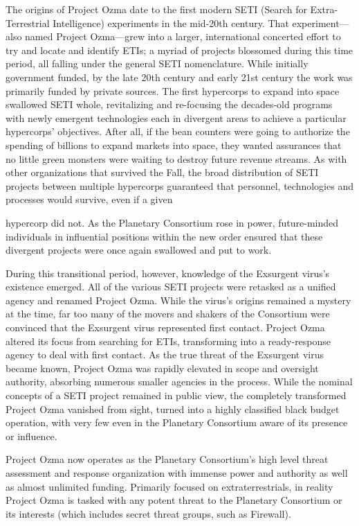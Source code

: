 The origins of Project Ozma date to the first modern SETI (Search for Extra-Terrestrial Intelligence) experiments in the mid-20th century. That experiment—also named Project Ozma—grew into a larger, international concerted effort to try and locate and identify ETIs; a myriad of projects blossomed during this time period, all falling under the general SETI nomenclature. While initially government funded, by the late 20th century and early 21st century the work was primarily funded by private sources. The first hypercorps to expand into space swallowed SETI whole, revitalizing and re-focusing the decades-old programs with newly emergent technologies each in divergent areas to achieve a particular hypercorps' objectives. After all, if the bean counters were going to authorize the spending of billions to expand markets into space, they wanted assurances that no little green monsters were waiting to destroy future revenue streams. As with other organizations that survived the Fall, the broad distribution of SETI projects between multiple hypercorps guaranteed that personnel, technologies and processes would survive, even if a given 

hypercorp did not. As the Planetary Consortium rose in power, future-minded individuals in influential positions within the new order ensured that these divergent projects were once again swallowed and put to work. 

During this transitional period, however, knowledge of the Exsurgent virus's existence emerged. All of the various SETI projects were retasked as a unified agency and renamed Project Ozma. While the virus's origins remained a mystery at the time, far too many of the movers and shakers of the Consortium were convinced that the Exsurgent virus represented first contact. Project Ozma altered its focus from searching for ETIs, transforming into a ready-response agency to deal with first contact. As the true threat of the Exsurgent virus became known, Project Ozma was rapidly elevated in scope and oversight authority, absorbing numerous smaller agencies in the process. While the nominal concepts of a SETI project remained in public view, the completely transformed Project Ozma vanished from sight, turned into a highly classified black budget operation, with very few even in the Planetary Consortium aware of its presence or influence. 

Project Ozma now operates as the Planetary Consortium's high level threat assessment and response organization with immense power and authority as well as almost unlimited funding. Primarily focused on extraterrestrials, in reality Project Ozma is tasked with any potent threat to the Planetary Consortium or its interests (which includes secret threat groups, such as Firewall). 

